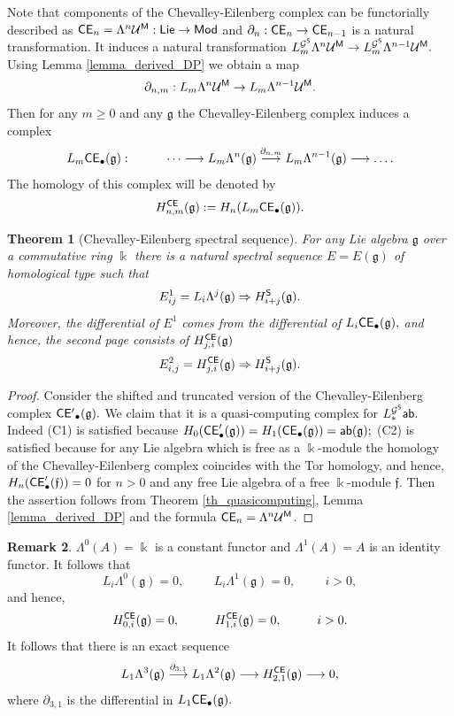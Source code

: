 \documentclass{amsart}
\numberwithin{equation}{section}
\newtheorem{theorem}{Theorem}[section]
\theoremstyle{definition}
\newtheorem{remark}[theorem]{Remark}
\def\GG{\mathcal{G}}
\def\UU{\mathcal{U}}
\def\gg{\mathfrak{g}}
\def\ff{\mathfrak{f}}
\def\kk{\Bbbk}
\begin{document}
Note that components of the Chevalley-Eilenberg complex can be functorially described as  ${\sf CE}_n=\Lambda^n \UU^{\sf M}:{\sf Lie}\to {\sf Mod}$ and  $\partial_n :{\sf CE}_n\to {\sf CE}_{n-1}$ is a natural transformation. It induces a natural transformation $L^{\GG^{\sf S}}_m \Lambda^n \UU^{\sf M} \to  L^{\GG^{\sf S}}_m \Lambda^{n-1} \UU^{\sf M}.$ Using Lemma \ref{lemma_derived_DP} we obtain a map 
$$\partial_{n,m} : L_m \Lambda^n \UU^{\sf M} \to  L_m \Lambda^{n-1} \UU^{\sf M}.$$ 
Then for any $m\geq 0$ and any $\gg$  the Chevalley-Eilenberg complex induces a complex  
$$L_m{\sf CE}_\bullet(\gg): \hspace{1cm}  \dots\longrightarrow  L_m \Lambda^n (\gg) \overset{\partial_{n,m}}\longrightarrow  L_m \Lambda^{n-1}(\gg) \longrightarrow \dots  .$$ 
The homology of this complex will be denoted by 
$$H_{n,m}^{\sf CE}(\gg):=H_n(L_m{\sf CE}_\bullet (\gg)).$$

\begin{theorem}[Chevalley-Eilenberg spectral sequence]\label{th_CE}
For any Lie algebra $\gg$ over a commutative ring $\kk$ there is a natural spectral sequence $E=E(\gg)$ of homological type such that 
$$E^1_{ij}=L_i \Lambda^j (\gg)  \Rightarrow H_{i+j}^{\sf S}(\gg).$$
Moreover, the differential of $E^1$ comes from  the differential of $L_i{\sf CE}_\bullet(\gg),$
and hence, the second page consists of $H_{j,i}^{\sf CE}(\gg)$ 
$$E^2_{i,j}=H_{j,i}^{\sf CE}(\gg)\Rightarrow H_{i+j}^{\sf S}(\gg).$$
\end{theorem}
\begin{proof}
Consider the shifted and truncated version of the Chevalley-Eilenberg complex ${\sf CE'}_\bullet(\gg).$ We claim that it is a quasi-computing complex for  $L_*^{\GG^{\sf S}}{\sf ab}.$ Indeed (C1) is satisfied because $H_0({\sf CE}'_\bullet(\gg))=H_1({\sf CE}_\bullet(\gg))={\sf ab}(\gg);$ (C2) is satisfied because for any Lie algebra which is free as a $\kk$-module \cite[Ch.XII, Th.7.1]{cartan1999homological} the homology of the  Chevalley-Eilenberg complex coincides with the Tor homology, and hence, $H_n({\sf CE}'_\bullet(\ff))=0$ for $n>0$ and any free Lie algebra of a free $\kk$-module $\ff.$ 
Then the assertion follows from Theorem \ref{th_quasicomputing}, Lemma \ref{lemma_derived_DP} and the formula ${\sf CE}_n=\Lambda^n\UU^{\sf M}$.
\end{proof}


\begin{remark}\label{rem_CE_spec}
$\Lambda^0(A)=\kk$ is a constant functor and $\Lambda^1(A)=A$ is an identity functor. It follows that 
$$L_i \Lambda^0(\gg)=0, \hspace{1cm} L_i\Lambda^1(\gg)=0,\hspace{1cm} i>0,$$
and hence, 
$$H_{0,i}^{\sf CE}(\gg)=0, \hspace{1cm} H_{1,i}^{\sf CE}(\gg)=0, \hspace{1cm} i>0.$$
It follows that there is an exact sequence
$$L_1\Lambda^3(\gg) \overset{\partial_{3,1}}\longrightarrow L_1 \Lambda^2 (\gg) \longrightarrow  H_{2,1}^{\sf CE}(\gg)\longrightarrow 0,$$
where $\partial_{3,1}$ is the differential in $L_1{\sf CE}_\bullet(\gg).$
\end{remark}
\end{document}
